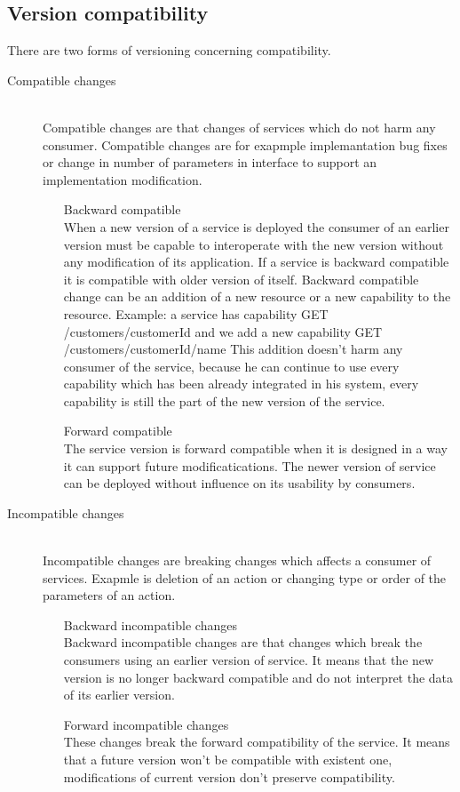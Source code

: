 \subsection{Version compatibility}
There are two forms of versioning concerning compatibility. \cite{website:service-versioning}
\begin{description}
  \item[Compatible changes] \hfill \\
  Compatible changes are that changes of services which do not harm any consumer. Compatible changes are for exapmple implemantation bug fixes or change in number of parameters in interface to support an implementation modification.
  \begin{enumerate}
    \item[Backward compatible] \hfill \\ 
  When a new version of a service is deployed the consumer of an earlier version must be capable to interoperate with the new version without any modification of its application. If a service is backward compatible it is compatible with older version of itself. Backward compatible change can be an addition of a new resource or a new capability to the resource.
  Example: a service has capability 
  GET
  /customers/{customerId}
  and we add a new capability
  GET
  /customers/{customerId}/name
  This addition doesn't harm any consumer of the service, because he can continue to use every capability which has been already integrated in his system, every capability is still the part of the new version of the service. 
  \item[Forward compatible] \hfill \\
  The service version is forward compatible when it is designed in a way it can support future modificatications. The newer version of service can be deployed without influence on its usability by consumers. 
  \end{enumerate}
  
  \item[Incompatible changes] \hfill \\
  Incompatible changes are breaking changes which affects a consumer of services. Exapmle is deletion of an action or changing type or order of the parameters of an action.
  \begin{enumerate} 
    \item[Backward incompatible changes]  \hfill \\
    Backward incompatible changes are that changes which break the consumers using an earlier version of service. It means that the new version is no longer backward compatible and do not interpret the data of its earlier version.
    \item[Forward incompatible changes] \hfill \\
    These changes break the forward compatibility of the service. It means that a future version won't be compatible with existent one, modifications of current version don't preserve compatibility.
  \end{enumerate}
\end{description}

